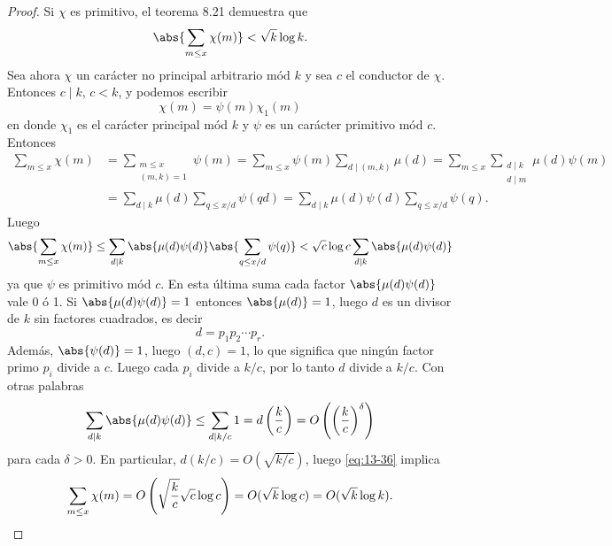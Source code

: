     \begin{proof}
        Si $\chi$ es primitivo, el teorema 8.21 demuestra que
        \begin{equation*}
            \abs{\sum_{m\leq x}\chi(m)}<\sqrt{k}\log k.
        \end{equation*}
        Sea ahora $\chi$ un carácter no principal arbitrario mód $k$ y sea $c$ el conductor de
        $\chi$. Entonces $c\mid k$, $c<k$, y podemos escribir
        \begin{equation*}
            \chi(m)=\psi(m)\chi_1(m)
        \end{equation*}
        en donde $\chi_1$ es el carácter principal mód $k$ y $\psi$ es un carácter primitivo
        mód $c$. Entonces
        \begin{align*}
            \sum_{m\leq x}\chi(m)&=\sum_{\substack{m\leq x\\(m,k)=1}}\psi(m)=\sum_{m\leq x}\psi(m)\sum_{d\mid(m,k)}\mu(d)=\sum_{m\leq x}\sum_{\substack{d\mid k\\d\mid m}}\mu(d)\psi(m)\\
            &=\sum_{d\mid k}\mu(d)\sum_{q\leq x/d}\psi(qd)=\sum_{d\mid k}\mu(d)\psi(d)\sum_{q\leq x/d}\psi(q).
        \end{align*}
        Luego
        \begin{equation}\label{eq:13-36}
            \abs{\sum_{m\leq x}\chi(m)}\leq\sum_{d\mid k}\abs{\mu(d)\psi(d)}\abs{\sum_{q\leq x/d}\psi(q)}<\sqrt{c}\log c\sum_{d\mid k}\abs{\mu(d)\psi(d)}
        \end{equation}
        ya que $\psi$ es primitivo mód $c$. En esta última suma cada factor
        $\abs{\mu(d)\psi(d)}$ vale 0 ó 1. Si $\abs{\mu(d)\psi(d)}=1$ entonces $\abs{\mu(d)}=1$,
        luego $d$ es un divisor de $k$ sin factores cuadrados, es decir
        \begin{equation*}
            d=p_1p_2\cdots p_r.
        \end{equation*}
        Además, $\abs{\psi(d)}=1$, luego $(d,c)=1$, lo que significa que ningún factor primo
        $p_i$ divide a $c$. Luego cada $p_i$ divide a $k/c$, por lo tanto $d$ divide a $k/c$. Con
        otras palabras
        \begin{equation*}
            \sum_{d\mid k}\abs{\mu(d)\psi(d)}\leq\sum_{d\mid k/c}1=d\left(\frac{k}{c}\right)=O\left(\left(\frac{k}{c}\right)^{\delta}\right)
        \end{equation*}
        para cada $\delta>0$. En particular, $d(k/c)=O(\sqrt{k/c})$, luego \eqref{eq:13-36}
        implica
        \begin{equation*}
            \sum_{m\leq x}\chi(m)=O\left(\sqrt{\frac{k}{c}}\sqrt{c}\log c\right)=O(\sqrt{k}\log c)=O(\sqrt{k}\log k).\qedhere
        \end{equation*}
    \end{proof}

